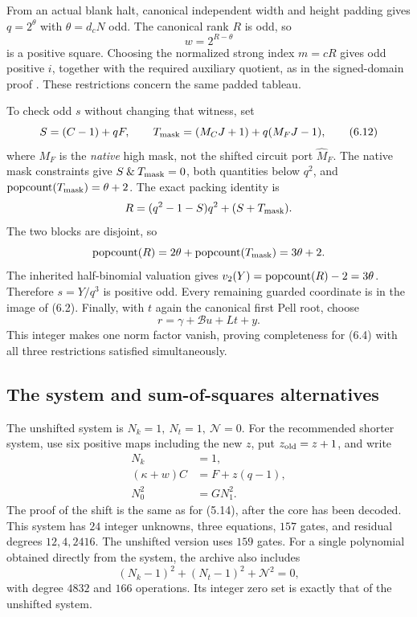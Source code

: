 From an actual blank halt, canonical independent width and height
padding gives \(q=2^\theta\) with \(\theta=d_cN\) odd.
The canonical rank \(R\) is odd, so
\[
w=2^{R-\theta}
\]
is a positive square.
Choosing the normalized strong index \(m=cR\) gives odd positive
\(i\), together with the required auxiliary quotient, as in
the signed-domain proof \cite{signed}.
These restrictions concern the same padded tableau.

To check odd \(s\) without changing that witness, set
\[
S=(C-1)+qF,\qquad
T_{\rm mask}=(M_CJ+1)+q(M_FJ-1),
\tag{6.12}
\]
where \(M_F\) is the \emph{native} high mask, not the shifted
circuit port \(\widehat M_F\).
The native mask constraints give
\(S\mathbin{\&}T_{\rm mask}=0\), both quantities below \(q^2\),
and \(\operatorname{popcount}(T_{\rm mask})=\theta+2\).
The exact packing identity is
\[
R=(q^2-1-S)q^2+(S+T_{\rm mask}).
\]
The two blocks are disjoint, so
\[
\operatorname{popcount}(R)=2\theta+\operatorname{popcount}(T_{\rm mask})=3\theta+2.
\]
The inherited half-binomial valuation gives
\(v_2(Y)=\operatorname{popcount}(R)-2=3\theta\). Therefore \(s=Y/q^3\) is positive odd.
Every remaining guarded coordinate is in the image of (6.2).
Finally, with \(t\) again the canonical first Pell root, choose
\[
r=\gamma+\mathcal B u+Lt+y.
\tag{6.13}
\]
This integer makes one norm factor vanish, proving completeness
for (6.4) with all three restrictions satisfied simultaneously.

\subsection{The system and sum-of-squares alternatives}

The unshifted system is \(N_k=1,\ N_t=1,\ \mathcal N=0\).
For the recommended shorter system, use six positive maps including
the new \(z\), put \(z_{\rm old}=z+1\), and write
\[
\boxed{
\begin{aligned}
N_k&=1,\\
(\kappa+w)C&=F+z(q-1),\\
N_0^2&=GN_1^2.
\end{aligned}}
\tag{6.14}
\]
The proof of the shift is the same as for (5.14), after the core
has been decoded. This system has \(24\) integer unknowns,
three equations, \(157\) gates, and residual degrees \(12,4,2416\).
The unshifted version uses \(159\) gates.
For a single polynomial obtained directly from the system, the
archive also includes
\[
(N_k-1)^2+(N_t-1)^2+\mathcal N^2=0,
\tag{6.15}
\]
with degree \(4832\) and \(166\) operations.
Its integer zero set is exactly that of the unshifted system.

